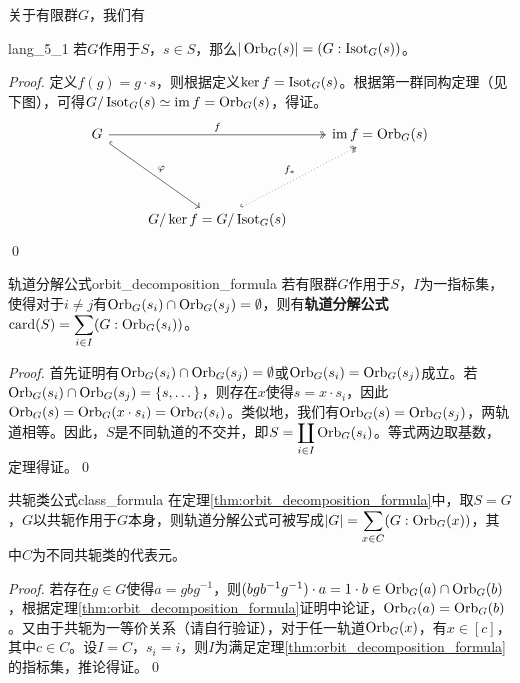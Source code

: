\documentclass[../main.tex]{subfiles}
\begin{document}
关于有限群$G$，我们有
\begin{proposition}{}{lang_5_1}
若$G$作用于$S$，$s\in S$，那么$|\operatorname{Orb}_G(s)|=(G:\operatorname{Isot}_G(s))$。
\end{proposition}
\begin{proof}
定义$f(g)=g\cdot s$，则根据定义$\ker f=\operatorname{Isot}_G(s)$。根据第一群同构定理（见下图），可得$G/\operatorname{Isot}_G(s)\simeq\operatorname{im} f=\operatorname{Orb}_G(s)$，得证。
$$\begin{tikzcd}
G \arrow[rdd, "\varphi", hook] \arrow[rr, "f", two heads] & {} & \im f=\orbit_G(s) \\ {} & {} & {}\\ {} & G/\ker f=G/\isotropy_G(s) \arrow[ruu, "f_*", two heads, dotted, hook] & {}
\end{tikzcd}$$
\qed
\end{proof}
\begin{theorem}{轨道分解公式}{orbit_decomposition_formula}
若有限群$G$作用于$S$，$I$为一指标集，使得对于$i\neq j$有$\operatorname{Orb}_G(s_i)\cap\operatorname{Orb}_G(s_j)=\emptyset$，则有\textbf{轨道分解公式}$\displaystyle\operatorname{card}(S)=\sum_{i\in I}(G:\operatorname{Orb}_G(s_i))$。
\end{theorem}
\begin{proof}
首先证明有$\operatorname{Orb}_G(s_i)\cap\operatorname{Orb}_G(s_j)=\emptyset$或$\operatorname{Orb}_G(s_i)=\operatorname{Orb}_G(s_j)$成立。若$\operatorname{Orb}_G(s_i)\cap\operatorname{Orb}_G(s_j)=\{s,\dots\}$，则存在$x$使得$s=x\cdot s_i$，因此$\operatorname{Orb}_G(s)=\operatorname{Orb}_G(x\cdot s_i)=\operatorname{Orb}_G(s_i)$。类似地，我们有$\operatorname{Orb}_G(s)=\operatorname{Orb}_G(s_j)$，两轨道相等。因此，$S$是不同轨道的不交并，即$\displaystyle S=\coprod_{i\in I}\operatorname{Orb}_G(s_i)$。等式两边取基数，定理得证。\qed
\end{proof}
\begin{corollary}{共轭类公式}{class_formula}
在定理\ref{thm:orbit_decomposition_formula}中，取$S=G$，$G$以共轭作用于$G$本身，则轨道分解公式可被写成$\displaystyle|G|=\sum_{x\in C}(G:\operatorname{Orb}_G(x))$，其中$C$为不同共轭类的代表元。
\end{corollary}
\begin{proof}
若存在$g\in G$使得$a=gbg^{-1}$，则$(bgb^{-1}g^{-1})\cdot a=1\cdot b\in\operatorname{Orb}_G(a)\cap\operatorname{Orb}_G(b)$，根据定理\ref{thm:orbit_decomposition_formula}证明中论证，$\operatorname{Orb}_G(a)=\operatorname{Orb}_G(b)$。又由于共轭为一等价关系（请自行验证），对于任一轨道$\operatorname{Orb}_G(x)$，有$x\in[c]$，其中$c\in C$。设$I=C$，$s_i=i$，则$I$为满足定理\ref{thm:orbit_decomposition_formula}的指标集，推论得证。\qed
\end{proof}
\end{document}
